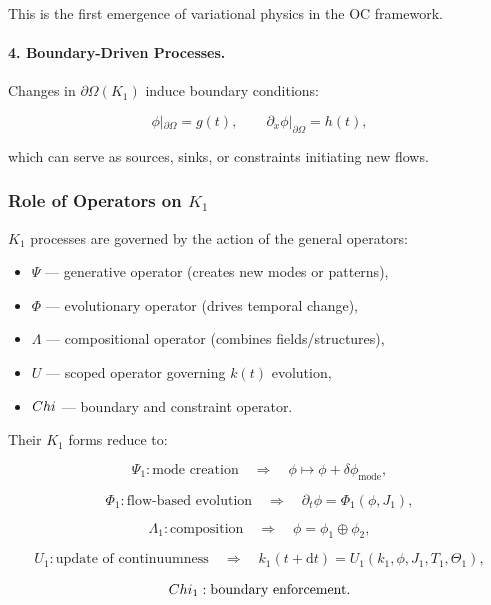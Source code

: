 This is the first emergence of variational physics in the OC framework.

\paragraph{4. Boundary-Driven Processes.}

Changes in $\partial\Omega(K_1)$ induce boundary conditions:

\[
\phi|_{\partial\Omega} = g(t),
\qquad
\partial_x\phi|_{\partial\Omega} = h(t),
\]

which can serve as sources, sinks, or constraints initiating new flows.

\subsubsection{Role of Operators on \texorpdfstring{$K_1$}{K_1}}

$K_1$ processes are governed by the action of the general operators:

\begin{itemize}
    \item $\Psi$ — generative operator (creates new modes or patterns),
    \item $\Phi$ — evolutionary operator (drives temporal change),
    \item $\Lambda$ — compositional operator (combines fields/structures),
    \item $U$ — scoped operator governing $k(t)$ evolution,
    \item $Chi$ — boundary and constraint operator.
\end{itemize}

Their $K_1$ forms reduce to:

\[
\Psi_1: \text{mode creation}
\quad\Rightarrow\quad
\phi \mapsto \phi + \delta\phi_{\text{mode}},
\]

\[
\Phi_1: \text{flow-based evolution}
\quad\Rightarrow\quad
\partial_t \phi = \Phi_1(\phi,J_1),
\]

\[
\Lambda_1: \text{composition}
\quad\Rightarrow\quad
\phi = \phi_1 \oplus \phi_2,
\]

\[
U_1: \text{update of continuumness}
\quad\Rightarrow\quad
k_1(t+\mathrm{d}t) = U_1(k_1,\phi,J_1,T_1,\Theta_1),
\]

\[
Chi_1: \text{boundary enforcement}.
\]

